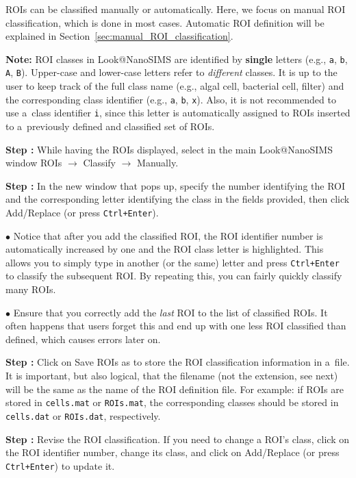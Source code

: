 \documentclass[a4paper, 11pt]{article}
\newcommand{\ttt}[1]{\texttt{#1}}
\newcommand{\lans}[1]{{\color{magenta}#1}}
\newcommand{\lanstf}[1]{{\color{cyan}#1}}
\newcommand\ra{\rightarrow}
\newcounter{step}
\newcommand\s{\addtocounter{step}{1}\noindent\textbf{Step \thestep:}{ }}
\newcommand\bul{\noindent$\bullet${ }}
\newcommand\bb[1]{\textbf{#1}}
\begin{document}
ROIs can be classified manually or automatically. Here, we focus on manual ROI classification, which is done in most cases. Automatic ROI definition will be explained in Section~\ref{sec:manual_ROI_classification}.

\bb{Note:} ROI classes in Look@NanoSIMS are identified by \bb{single} letters (e.g., \ttt{a}, \ttt{b}, \ttt{A}, \ttt{B}). Upper-case and lower-case letters refer to \emph{different} classes. It is up to the user to keep track of the full class name (e.g., algal cell, bacterial cell, filter) and the corresponding class identifier (e.g., \ttt{a}, \ttt{b}, \ttt{x}). Also, it is not recommended to use a~class identifier \ttt{i}, since this letter is automatically assigned to ROIs inserted to a~previously defined and classified set of ROIs.

\setcounter{step}{0}

\s While having the ROIs displayed, select in the main Look@NanoSIMS window \lans{ROIs} $\ra$ \lans{Classify} $\ra$ \lans{Manually}.

\s In the new window that pops up, specify the \lanstf{number} identifying the ROI and the corresponding \lanstf{letter} identifying the class in the fields provided, then click \lans{Add/Replace} (or press \ttt{Ctrl+Enter}). 

\bul Notice that after you add the classified ROI, the ROI identifier number is automatically increased by one and the ROI class letter is highlighted. This allows you to simply type in another (or the same) letter and press \ttt{Ctrl+Enter} to classify the subsequent ROI. By repeating this, you can fairly quickly classify many ROIs.

\bul Ensure that you correctly add the \emph{last} ROI to the list of classified ROIs. It often happens that users forget this and end up with one less ROI classified than defined, which causes errors later on.

\s Click on \lans{Save ROIs as} to store the ROI classification information in a~file. It is important, but also logical, that the filename (not the extension, see next) will be the same as the name of the ROI definition file. For example: if ROIs are stored in \ttt{cells.mat} or \ttt{ROIs.mat}, the corresponding classes should be stored in \ttt{cells.dat} or \ttt{ROIs.dat}, respectively.

\s Revise the ROI classification. If you need to change a ROI's class, click on the ROI identifier number, change its class, and click on \lans{Add/Replace} (or press \ttt{Ctrl+Enter}) to update it.
\end{document}

